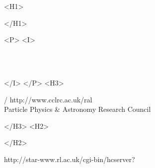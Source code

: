 \begin{htmlonly}
   \xlabel{}
   \begin{rawhtml} <H1> \end{rawhtml}
      \stardoctitle
   \begin{rawhtml} </H1> \end{rawhtml}
 
 
   \begin{rawhtml} <P> <I> \end{rawhtml}
   \stardoccategory \stardocnumber \\
   \stardocauthors \\
   \stardocdate
   \begin{rawhtml} </I> </P> <H3> \end{rawhtml}
       /
                        {http://www.cclrc.ac.uk/ral} \\
      Particle Physics \& Astronomy Research Council \\
   \begin{rawhtml} </H3> <H2> \end{rawhtml}
   \begin{rawhtml} </H2> \end{rawhtml}
      {http://star-www.rl.ac.uk/cgi-bin/hcserver?\stardocsource}\\
 
 
 
\end{htmlonly}
 
